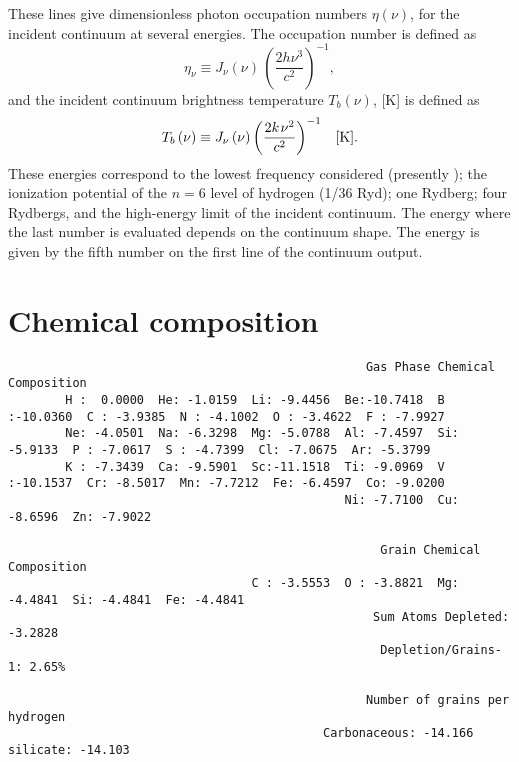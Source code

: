 These lines give dimensionless photon occupation numbers $\eta(\nu)$,
for the incident continuum at several energies.
The occupation number is defined as
\begin{equation}
{\eta _\nu } \equiv {J_\nu }\left( \nu  \right)\,{\left( {\frac{{2h{\nu
^3}}}{{{c^2}}}} \right)^{ - 1}},%
\end{equation}
and the incident continuum brightness temperature ${T_b}( \nu  )$, [K] is defined as
\begin{equation}
{T_b}\left( \nu  \right) \equiv {J_\nu }\left( \nu  \right){\left(
{\frac{{2k{\kern 1pt} {\nu ^2}}}{{{c^2}}}} \right)^{ - 1}}\quad  [\mathrm{K}].%
\end{equation}
These energies correspond to the lowest frequency considered
(presently \emmmhz );
the ionization potential of the $n = 6$ level of hydrogen
(1/36 Ryd); one Rydberg; four Rydbergs, and the high-energy limit of the
incident continuum.
The energy where the last number is evaluated depends
on the continuum shape.
The energy is given by the fifth number on the
first line of the continuum output.

\section{Chemical composition}
{\setverbatimfontsize{\tiny}
\begin{verbatim}
                                                  Gas Phase Chemical Composition
        H :  0.0000  He: -1.0159  Li: -9.4456  Be:-10.7418  B :-10.0360  C : -3.9385  N : -4.1002  O : -3.4622  F : -7.9927
        Ne: -4.0501  Na: -6.3298  Mg: -5.0788  Al: -7.4597  Si: -5.9133  P : -7.0617  S : -4.7399  Cl: -7.0675  Ar: -5.3799
        K : -7.3439  Ca: -9.5901  Sc:-11.1518  Ti: -9.0969  V :-10.1537  Cr: -8.5017  Mn: -7.7212  Fe: -6.4597  Co: -9.0200
                                               Ni: -7.7100  Cu: -8.6596  Zn: -7.9022 

                                                    Grain Chemical Composition
                                  C : -3.5553  O : -3.8821  Mg: -4.4841  Si: -4.4841  Fe: -4.4841
                                                   Sum Atoms Depleted: -3.2828
                                                    Depletion/Grains-1: 2.65%

                                                  Number of grains per hydrogen
                                            Carbonaceous: -14.166  silicate: -14.103
\end{verbatim}
}

